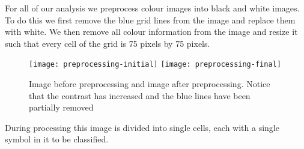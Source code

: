 
For all of our analysis we preprocess colour images into black and white
images. To do this we first remove the blue grid lines from the image and
replace them with white. We then remove all colour information from the image
and resize it such that every cell of the grid is 75 pixels by 75 pixels.

\begin{figure}[H]
    \begin{center}
    \texttt{[image: preprocessing-initial]}
    \texttt{[image: preprocessing-final]}
    \caption{Image before preprocessing and image after preprocessing. Notice
        that the contrast has increased and the blue lines have been partially
        removed}
    \end{center}
\end{figure}

During processing this image is divided into single cells, each with a single symbol
in it to be classified.
